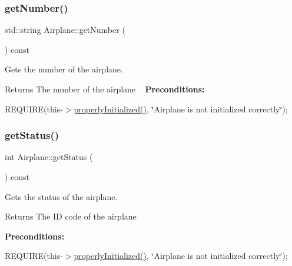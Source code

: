 \subsubsection{\texorpdfstring{get\+Number()}{getNumber()}}
{\footnotesize\ttfamily std\+::string Airplane\+::get\+Number (\begin{DoxyParamCaption}{ }\end{DoxyParamCaption}) const}



Gets the number of the airplane. 

\begin{DoxyReturn}{Returns}
The number of the airplane ~\newline
{\bfseries Preconditions\+:}
\begin{DoxyItemize}
\item R\+E\+Q\+U\+I\+RE(this-\/$>$\mbox{\hyperlink{class_airplane_a6f80df8f692cc8d67d292c1e9f26d59e}{properly\+Initialized()}}, \char`\"{}\+Airplane is not initialized correctly\char`\"{}); 
\end{DoxyItemize}
\end{DoxyReturn}
\mbox{\label{class_airplane_ac1247e4c17755c544a7fcd709ca44c14}} 
\subsubsection{\texorpdfstring{get\+Status()}{getStatus()}}
{\footnotesize\ttfamily int Airplane\+::get\+Status (\begin{DoxyParamCaption}{ }\end{DoxyParamCaption}) const}



Gets the status of the airplane. 

\begin{DoxyReturn}{Returns}
The ID code of the airplane
\end{DoxyReturn}
{\bfseries Preconditions\+:}
\begin{DoxyItemize}
\item R\+E\+Q\+U\+I\+RE(this-\/$>$\mbox{\hyperlink{class_airplane_a6f80df8f692cc8d67d292c1e9f26d59e}{properly\+Initialized()}}, \char`\"{}\+Airplane is not initialized correctly\char`\"{}); 
\end{DoxyItemize}\mbox{\label{class_airplane_acd9fe7c6dd10492f6a7995c3d2ddc8ac}} 
